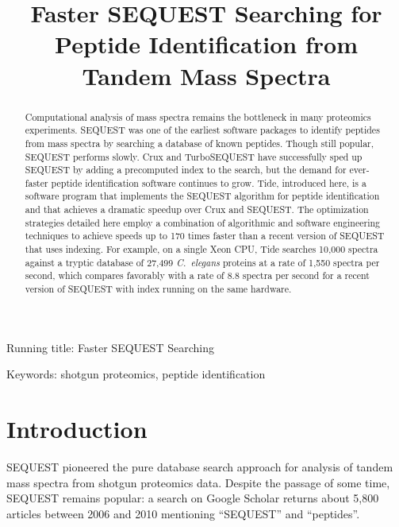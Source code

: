



\title{Faster SEQUEST Searching for Peptide
  Identification from Tandem Mass Spectra}

\doublespacing



\maketitle

\clearpage

\begin{abstract}

Computational analysis of mass spectra remains the bottleneck in many
proteomics experiments. SEQUEST was one of the earliest software
packages to identify peptides from mass spectra by searching a
database of known peptides. Though still popular, SEQUEST performs
slowly. Crux and TurboSEQUEST have successfully sped up SEQUEST by
adding a precomputed index to the search, but the demand for
ever-faster peptide identification software continues to grow. Tide,
introduced here, is a software program that implements the SEQUEST
algorithm for peptide identification and that achieves a dramatic
speedup over Crux and SEQUEST.  The optimization strategies detailed
here employ a combination of algorithmic and software engineering
techniques to achieve speeds up to 170 times faster than a recent
version of SEQUEST that uses indexing.  For example, on a single Xeon
CPU, Tide searches 10,000 spectra against a tryptic database of 27,499
{\it C.\ elegans} proteins at a rate of 1,550 spectra per second,
which compares favorably with a rate of 8.8 spectra per second for a
recent version of SEQUEST with index running on the same hardware.

\end{abstract}

\noindent Running title: {\sc Faster SEQUEST Searching}

\noindent Keywords: shotgun proteomics, peptide identification

\clearpage

\section{Introduction}

SEQUEST \cite{eng:approach} pioneered the pure database search
approach for analysis of tandem mass spectra from shotgun proteomics
data. Despite the passage of some time, SEQUEST remains popular: a
search on Google Scholar returns about 5,800 articles between 2006
and 2010 mentioning ``SEQUEST'' and ``peptides''.

